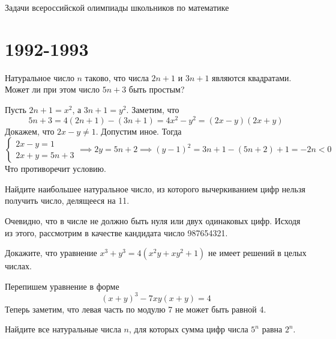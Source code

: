 \documentclass[11pt, a4paper]{template}
\begin{document}
\begin{titlepage}
  \begin{center}
	\Huge{Задачи всероссийской олимпиады школьников по математике
}
  \end{center}
\end{titlepage}

\chapter{1992-1993}

\begin{exercise}
Натуральное число $n$ таково, что числа $2n + 1$ и $3n + 1$ являются
квадратами. Может ли при этом число $5n + 3$ быть простым?
\end{exercise}

\begin{solution}
Пусть $2n+1=x^{2}$, а $3n+1 = y^{2}$. Заметим, что
$$
5n+3 = 4(2n+1) - (3n+1) = 4x^{2} - y^{2} = (2x - y)(2x + y)
$$
Докажем, что $2x - y \neq 1$. Допустим иное. Тогда
$$
\begin{cases}
2x - y = 1 \\
2x + y = 5n + 3
\end{cases} \implies 2y = 5n + 2 \implies (y - 1)^{2} = 3n+1 - (5n + 2) + 1 = -2n < 0
$$
Что противоречит условию.
\end{solution}

\begin{exercise}
Найдите наибольшее натуральное число, из которого вычеркиванием цифр нельзя получить число, делящееся на 11.
\end{exercise}

\begin{solution}
Очевидно, что в числе не должно быть нуля или двух одинаковых цифр. Исходя из этого, рассмотрим в качестве кандидата число 987654321. 
\end{solution}


\begin{exercise}
Докажите, что уравнение $x^{3} + y^{3} = 4(x^{2} y + xy^{2} + 1)$ не имеет решений в целых числах.
\end{exercise}

\begin{solution}
Перепишем уравнение в форме
$$
(x + y)^{3} - 7xy(x + y) = 4
$$
Теперь заметим, что левая часть по модулю 7 не может быть равной 4. 
\end{solution}

\begin{exercise}
Найдите все натуральные числа $n$, для которых сумма цифр числа $5^{n}$ равна $2^{n}$.
\end{exercise}
\end{document}
